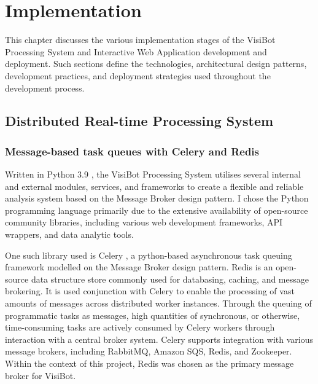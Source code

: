 
\chapter{Implementation}


This chapter discusses the various implementation stages of the VisiBot Processing System and Interactive Web Application development and deployment. Such sections define the technologies, architectural design patterns, development practices, and deployment strategies used throughout the development process.

\section{Distributed Real-time Processing System}

\subsection{Message-based task queues with Celery and Redis}

Written in Python 3.9 \citep{Python39}, the VisiBot Processing System utilises several internal and external modules, services, and frameworks to create a flexible and reliable analysis system based on the Message Broker design pattern. I chose the Python programming language primarily due to the extensive availability of open-source community libraries, including various web development frameworks, API wrappers, and data analytic tools.

One such library used is Celery \citep{Celery}, a python-based asynchronous task queuing framework modelled on the Message Broker design pattern. Redis \citep{Redis} is an open-source data structure store commonly used for databasing, caching, and message brokering. It is used conjunction with Celery to enable the processing of vast amounts of messages across distributed worker instances. Through the queuing of programmatic tasks as messages, high quantities of synchronous, or otherwise, time-consuming tasks are actively consumed by Celery workers through interaction with a central broker system. Celery supports integration with various message brokers, including RabbitMQ, Amazon SQS, Redis, and Zookeeper. Within the context of this project, Redis was chosen as the primary message broker for VisiBot.

